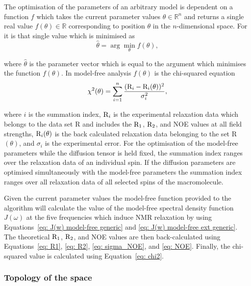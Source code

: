 \begin{htmlonly}
\begin{htmlonly}
The optimisation of the parameters of an arbitrary model is dependent on a function $f$ which takes the current parameter values $\theta \in \mathbb{R}^n$ and returns a single real value $f(\theta) \in \mathbb{R}$ corresponding to position $\theta$ in the $n$-dimensional space.  For it is that single value which is minimised as
\begin{equation}
 \hat\theta = \arg \min_\theta f(\theta),
\end{equation}

\noindent where $\hat\theta$ is the parameter vector which is equal to the argument which minimises the function $f(\theta)$.  In model-free analysis $f(\theta)$ is the chi-squared equation
\begin{equation} \label{eq: chi2}
 \chi^2(\theta) = \sum_{i=1}^n \frac{(\mathrm{R}_i - \mathrm{R}_i(\theta))^2}{\sigma_i^2},
\end{equation}

\noindent where $i$ is the summation index, $\mathrm{R}_i$ is the experimental relaxation data which belongs to the data set R and includes the $\mathrm{R}_1$, $\mathrm{R}_2$, and NOE values at all field strengths, $\mathrm{R}_i(\theta)$ is the back calculated relaxation data belonging to the set R$(\theta)$, and $\sigma_i$ is the experimental error.  For the optimisation of the model-free parameters while the diffusion tensor is held fixed, the summation index ranges over the relaxation data of an individual spin.  If the diffusion parameters are optimised simultaneously with the model-free parameters the summation index ranges over all relaxation data of all selected spins of the macromolecule.

Given the current parameter values the model-free function provided to the algorithm will calculate the value of the model-free spectral density function $J(\omega)$ at the five frequencies which induce NMR relaxation by using Equations~\eqref{eq: J(w) model-free generic} and \eqref{eq: J(w) model-free ext generic}.  The theoretical $\mathrm{R}_1$, $\mathrm{R}_2$, and NOE values are then back-calculated using Equations~\eqref{eq: R1}, \eqref{eq: R2}, \eqref{eq: sigma_NOE}, and \eqref{eq: NOE}.  Finally, the chi-squared value is calculated using Equation~\eqref{eq: chi2}.


\subsubsection{Topology of the space}


\end{htmlonly}
\end{htmlonly}

